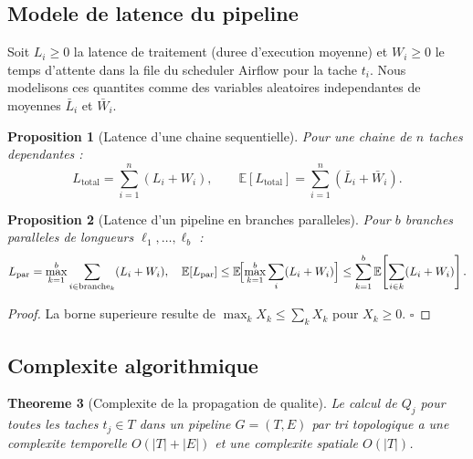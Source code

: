 \documentclass[12pt,a4paper]{article}
\theoremstyle{plain}
\newtheorem{theorem}{Theoreme}[section]
\newtheorem{proposition}[theorem]{Proposition}
\theoremstyle{definition}
\theoremstyle{remark}
\newcommand{\E}{\mathbb{E}}
\begin{document}
\subsection{Modele de latence du pipeline}
\label{subsec:latency}

Soit $L_i \geq 0$ la latence de traitement (duree d'execution moyenne)
et $W_i \geq 0$ le temps d'attente dans la file du scheduler Airflow
pour la tache $t_i$. Nous modelisons ces quantites comme des variables
aleatoires independantes de moyennes $\bar L_i$ et $\bar W_i$.

\begin{proposition}[Latence d'une chaine sequentielle]
\label{prop:latency_chain}
Pour une chaine de $n$ taches dependantes :
\begin{equation}
L_{\text{total}} = \sum_{i=1}^n (L_i + W_i),
\qquad
\E[L_{\text{total}}] = \sum_{i=1}^n (\bar L_i + \bar W_i).
\label{eq:latency}
\end{equation}
\end{proposition}

\begin{proposition}[Latence d'un pipeline en branches paralleles]
\label{prop:latency_parallel}
Pour $b$ branches paralleles de longueurs $\ell_1,\ldots,\ell_b$ :
\begin{equation}
L_{\text{par}} = \max_{k=1}^b \sum_{i \in \text{branche}_k} (L_i + W_i),
\quad
\E[L_{\text{par}}]
\leq \E\!\Bigl[\max_{k=1}^b \sum_{i} (L_i+W_i)\Bigr]
\leq \sum_{k=1}^b \E\!\left[\sum_{i\in k}(L_i+W_i)\right].
\label{eq:latency_par}
\end{equation}
\end{proposition}

\begin{proof}
La borne superieure resulte de $\max_k X_k \leq \sum_k X_k$
pour $X_k \geq 0$. \hfill$\square$
\end{proof}

\subsection{Complexite algorithmique}
\label{subsec:complexity}

\begin{theorem}[Complexite de la propagation de qualite]
\label{thm:complexity}
Le calcul de $Q_j$ pour toutes les taches $t_j \in T$ dans un pipeline
$G=(T,E)$ par tri topologique a une complexite temporelle $O(|T|+|E|)$
et une complexite spatiale $O(|T|)$.
\end{theorem}
\end{document}
